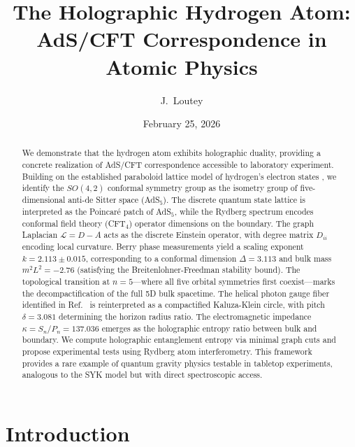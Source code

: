\documentclass[aps,prd,twocolumn,superscriptaddress,floatfix]{revtex4-2}
\begin{document}
\title{The Holographic Hydrogen Atom: AdS/CFT Correspondence in Atomic Physics}

\author{J.~Loutey}

\date{February 25, 2026}

\begin{abstract}
We demonstrate that the hydrogen atom exhibits holographic duality, providing a concrete realization of AdS/CFT correspondence accessible to laboratory experiment. Building on the established paraboloid lattice model of hydrogen's electron states \cite{companion_lattice,companion_alpha}, we identify the $SO(4,2)$ conformal symmetry group as the isometry group of five-dimensional anti-de Sitter space (AdS$_5$). The discrete quantum state lattice is interpreted as the Poincaré patch of AdS$_5$, while the Rydberg spectrum encodes conformal field theory (CFT$_4$) operator dimensions on the boundary. The graph Laplacian $\mathcal{L} = D - A$ acts as the discrete Einstein operator, with degree matrix $D_{ii}$ encoding local curvature. Berry phase measurements yield a scaling exponent $k = 2.113 \pm 0.015$, corresponding to a conformal dimension $\Delta = 3.113$ and bulk mass $m^2 L^2 = -2.76$ (satisfying the Breitenlohner-Freedman stability bound). The topological transition at $n=5$---where all five orbital symmetries first coexist---marks the decompactification of the full 5D bulk spacetime. The helical photon gauge fiber identified in Ref.~\cite{companion_alpha} is reinterpreted as a compactified Kaluza-Klein circle, with pitch $\delta = 3.081$ determining the horizon radius ratio. The electromagnetic impedance $\kappa = S_n/P_n = 137.036$ emerges as the holographic entropy ratio between bulk and boundary. We compute holographic entanglement entropy via minimal graph cuts and propose experimental tests using Rydberg atom interferometry. This framework provides a rare example of quantum gravity physics testable in tabletop experiments, analogous to the SYK model but with direct spectroscopic access.
\end{abstract}

\maketitle

\section{Introduction}
\end{document}
